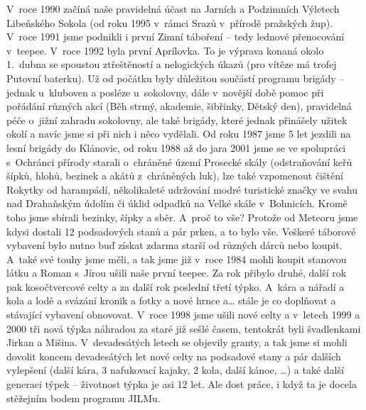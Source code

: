 \documentclass[a5paper, 11pt, twoside]{article}
\begin{document}
V~roce 1990 začíná naše pravidelná účast na Jarních a Podzimních
Výletech Libeňského Sokola (od roku 1995 v~rámci Srazů v~přírodě
pražských žup). V~roce 1991 jsme podnikli i první Zimní táboření -- tedy
lednové přenocování v~teepee. V~roce 1992 byla první Aprílovka. To je
výprava konaná okolo 1.~dubna se spoustou ztřeštěností a nelogických
úkazů (pro vítěze má trofej Putovní baterku). Už od počátku byly
důležitou součástí programu brigády -- jednak u~kluboven a posléze
u~sokolovny, dále v~novější době pomoc při pořádání různých akcí (Běh
strmý, akademie, šibřinky, Dětský den), pravidelná péče o~jižní zahradu
sokolovny, ale také brigády, které jednak přinášely užitek okolí a navíc
jsme si při nich i něco vydělali. Od roku 1987 jsme 5 let jezdili na
lesní brigády do Klánovic, od roku 1988 až do jara 2001 jsme se ve
spolupráci s~Ochránci přírody starali o~chráněné území Prosecké skály
(odstraňování keřů šípků, hlohů, bezinek a akátů z~chráněných luk), lze
také vzpomenout čištění Rokytky od harampádí, několikaleté udržování
modré turistické značky ve svahu nad Drahaňským údolím či úklid odpadků
na Velké skále v~Bohnicích. Kromě toho jsme sbírali bezinky, šípky a
sběr. A~proč to vše? Protože od Meteoru jsme kdysi dostali 12
podsadových stanů a pár prken, a to bylo vše. Veškeré táborové vybavení
bylo nutno buď získat zdarma starší od různých dárců nebo koupit. A~také
své touhy jsme měli, a tak jsme již v~roce 1984 mohli koupit stanovou
látku a Roman s~Jírou ušili naše první teepee. Za rok přibylo druhé,
další rok pak kosočtvercové celty a za další rok poslední třetí týpko.
A~kára a nářadí a kola a lodě a svázání kronik a fotky a nové hrnce a\ldots{}
stále je co doplňovat a stávající vybavení obnovovat. V~roce 1998 jsme
ušili nové celty a v~letech 1999 a 2000 tři nová týpka náhradou za staré
již sešlé časem, tentokrát byli švadlenkami Jirkan a Mišina.
V~devadesátých letech se objevily granty, a tak jsme si mohli dovolit
koncem devadesátých let nové celty na podsadové stany a pár dalších
vylepšení (další kára, 3 nafukovací kajaky, 2 kola, další kánoe, \ldots{}) a
také další generaci týpek -- životnost týpka je asi 12 let. Ale dost
práce, i když ta je docela stěžejním bodem programu JILMu.
\end{document}
